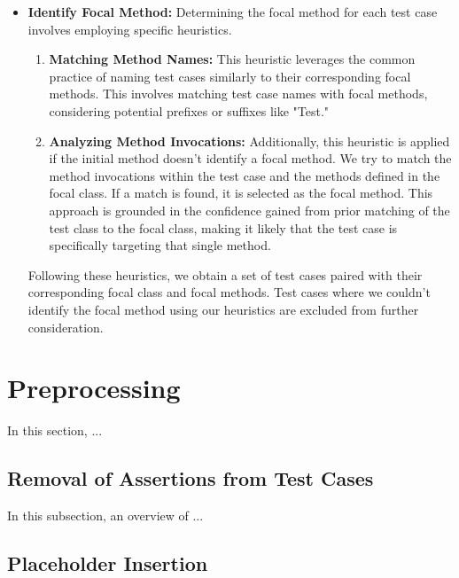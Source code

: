 \begin{itemize}
  \item \textbf{Identify Focal Method:} Determining the focal method for each test case involves employing specific heuristics. 
  \begin{enumerate}
      \item \textbf{Matching Method Names:} This heuristic leverages the common practice of naming test cases similarly to their corresponding focal methods. This involves matching test case names with focal methods, considering potential prefixes or suffixes like "Test."
      \item \textbf{Analyzing Method Invocations:} Additionally, this heuristic is applied if the initial method doesn't identify a focal method. We try to match the method invocations within the test case and the methods defined in the focal class. If a match is found, it is selected as the focal method. This approach is grounded in the confidence gained from prior matching of the test class to the focal class, making it likely that the test case is specifically targeting that single method.
  \end{enumerate}

  Following these heuristics, we obtain a set of test cases paired with their corresponding focal class and focal methods. Test cases where we couldn't identify the focal method using our heuristics are excluded from further consideration.
  
\end{itemize}

\section{Preprocessing}
\label{sec:preprocessing}
\vspace{0.2 cm}

In this section, ...

\vspace{0.1 cm}
\subsection{Removal of Assertions from Test Cases}
\label{sec:assertion_removal}
\vspace{0.1 cm}

In this subsection, an overview of ...

\vspace{0.1 cm}
\subsection{Placeholder Insertion}
\label{sec:placeholder_insertion}
\vspace{0.1 cm}

